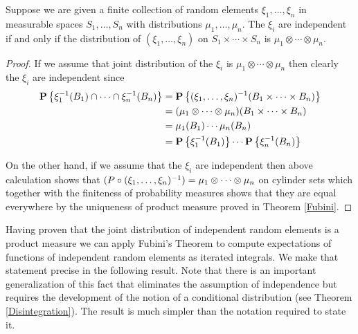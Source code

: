 \begin{lem}\label{IndependenceProductMeasures}Suppose we are given a finite collection of
  random elements $\xi_1, \dots, \xi_n$ in measurable spaces
  $S_1, \dots, S_n$ with distributions $\mu_1, \dots, \mu_n$.  The
  $\xi_i$ are independent if and only if the distribution of $(\xi_1,
  \dots, \xi_n)$ on $S_1 \times \cdots \times S_n$ is $\mu_1 \otimes
  \cdots \otimes \mu_n$.
\end{lem}
\begin{proof}If we assume that joint distribution of the $\xi_i$ is $\mu_1 \otimes
  \cdots \otimes \mu_n$ then clearly the $\xi_i$ are independent since 
\begin{align*}
\probability{\xi_1^{-1}(B_1) \cap \cdots \cap \xi_n^{-1}(B_n)} &=
\probability{(\xi_1, \dots, \xi_n)^{-1}(B_1 \times \cdots \times B_n)}
  \\
&= (\mu_1 \otimes \cdots \otimes \mu_n)(B_1 \times \cdots \times B_n) \\
&= \mu_1(B_1) \cdots \mu_n(B_n) \\
&=\probability{\xi_1^{-1}(B_1)} \cdots \probability{\xi_n^{-1}(B_n)}
\end{align*}

On the other hand, if we assume that the $\xi_i$ are independent then
above calculation shows that $(\pushforward{(\xi_1, \dots, \xi_n)}{P}) =
\mu_1 \otimes \cdots \otimes \mu_n$ on cylinder sets which together
with the finiteness of probability measures shows that
they are equal everywhere by the uniqueness of product measure proved
in Theorem \ref{Fubini}.
\end{proof}

Having proven that the joint distribution of independent random
elements is a product measure we can apply Fubini's Theorem to compute
expectations of functions of independent random elements as iterated
integrals.  We make that statement precise in the following result.
Note that there is an important generalization of this fact that
eliminates the assumption of independence but requires the development
of the notion of a conditional distribution (see Theorem
\ref{Disintegration}).  The result is much simpler than the notation
required to state it.

